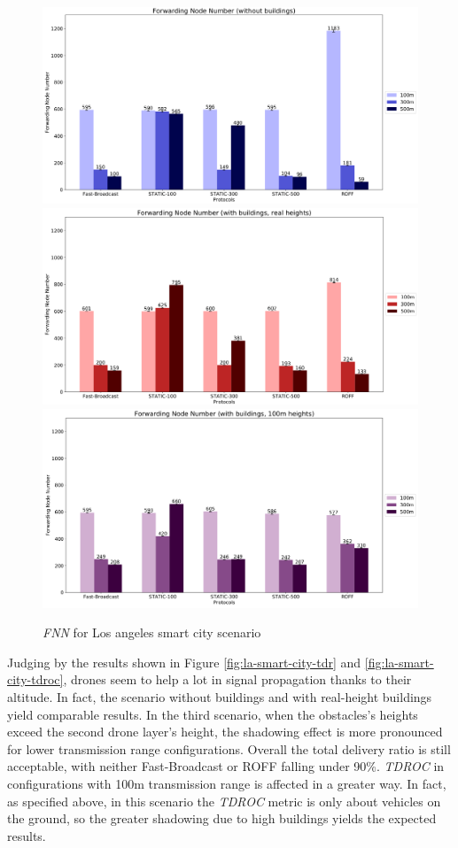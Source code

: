 	\begin{figure}[H]
		\centering
		\includegraphics[width=1.0\textwidth]{immagini/la-smart-city/b0/fnn}
		\includegraphics[width=1.0\textwidth]{immagini/la-smart-city/b1/h0/fnn}
		\includegraphics[width=1.0\textwidth]{immagini/la-smart-city/b1//h1/fnn}
		\caption{\textit{FNN} for Los angeles smart city scenario}
		\label{fig:la-smart-city-fnn}
	\end{figure}

	Judging by the results shown in Figure \ref{fig:la-smart-city-tdr} and \ref{fig:la-smart-city-tdroc}, drones seem to help a lot in signal propagation thanks to their altitude. In fact, the scenario without buildings and with real-height buildings yield comparable results. In the third scenario, when the obstacles's heights exceed the second drone layer's height, the shadowing effect is more pronounced for lower transmission range configurations. Overall the total delivery ratio is still acceptable, with neither Fast-Broadcast or ROFF falling under 90\%. \textit{TDROC} in configurations with 100m transmission range is affected in a greater way. In fact, as specified above, in this scenario the \textit{TDROC} metric is only about vehicles on the ground, so the greater shadowing due to high buildings yields the expected results.
	
